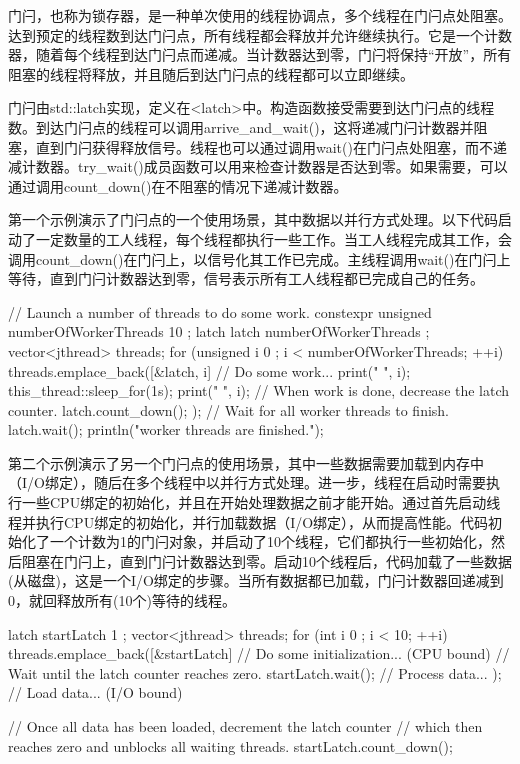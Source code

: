 门闩，也称为锁存器，是一种单次使用的线程协调点，多个线程在门闩点处阻塞。达到预定的线程数到达门闩点，所有线程都会释放并允许继续执行。它是一个计数器，随着每个线程到达门闩点而递减。当计数器达到零，门闩将保持“开放”，所有阻塞的线程将释放，并且随后到达门闩点的线程都可以立即继续。

门闩由std::latch实现，定义在<latch>中。构造函数接受需要到达门闩点的线程数。到达门闩点的线程可以调用arrive\_and\_wait()，这将递减门闩计数器并阻塞，直到门闩获得释放信号。线程也可以通过调用wait()在门闩点处阻塞，而不递减计数器。try\_wait()成员函数可以用来检查计数器是否达到零。如果需要，可以通过调用count\_down()在不阻塞的情况下递减计数器。

第一个示例演示了门闩点的一个使用场景，其中数据以并行方式处理。以下代码启动了一定数量的工人线程，每个线程都执行一些工作。当工人线程完成其工作，会调用count\_down()在门闩上，以信号化其工作已完成。主线程调用wait()在门闩上等待，直到门闩计数器达到零，信号表示所有工人线程都已完成自己的任务。

\begin{cpp}
// Launch a number of threads to do some work.
constexpr unsigned numberOfWorkerThreads { 10 };
latch latch { numberOfWorkerThreads };
vector<jthread> threads;
for (unsigned i { 0 }; i < numberOfWorkerThreads; ++i) {
    threads.emplace_back([&latch, i] {
        // Do some work...
        print("{} ", i);
        this_thread::sleep_for(1s);
        print("{} ", i);
        // When work is done, decrease the latch counter.
        latch.count_down();
    });
}
// Wait for all worker threads to finish.
latch.wait();
println("\nAll worker threads are finished.");
\end{cpp}

第二个示例演示了另一个门闩点的使用场景，其中一些数据需要加载到内存中（I/O绑定），随后在多个线程中以并行方式处理。进一步，线程在启动时需要执行一些CPU绑定的初始化，并且在开始处理数据之前才能开始。通过首先启动线程并执行CPU绑定的初始化，并行加载数据（I/O绑定），从而提高性能。代码初始化了一个计数为1的门闩对象，并启动了10个线程，它们都执行一些初始化，然后阻塞在门闩上，直到门闩计数器达到零。启动10个线程后，代码加载了一些数据(从磁盘)，这是一个I/O绑定的步骤。当所有数据都已加载，门闩计数器回递减到0，就回释放所有(10个)等待的线程。

\begin{cpp}
latch startLatch { 1 };
vector<jthread> threads;
for (int i { 0 }; i < 10; ++i) {
  threads.emplace_back([&startLatch] {
     // Do some initialization... (CPU bound)
     // Wait until the latch counter reaches zero.
     startLatch.wait();
     // Process data...
  });
}
// Load data... (I/O bound)

// Once all data has been loaded, decrement the latch counter
// which then reaches zero and unblocks all waiting threads.
startLatch.count_down();
\end{cpp}























